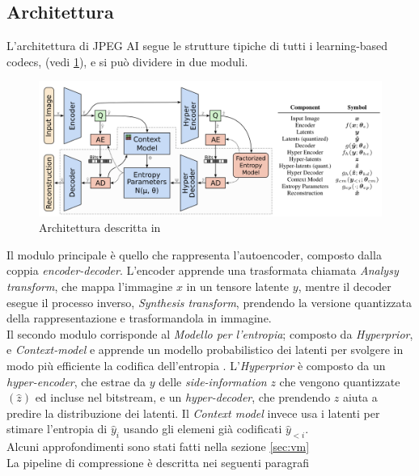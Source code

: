 \subsection{Architettura}\label{sec:architetturaJPEGAI}
L'architettura di JPEG AI segue le strutture tipiche di tutti i learning-based codecs,  \cite{minnen2018joint} (vedi \ref{fig:architmin}), e si può dividere in due moduli.
\begin{figure}
    \centering
    \includegraphics[width=1\linewidth]{img/architetturaJPEGAI.png}
    \caption{Architettura descritta in \cite{minnen2018joint}}
    \label{fig:architmin}
\end{figure}
Il modulo principale è quello che rappresenta l'autoencoder, composto dalla coppia \textit{encoder-decoder}.
L'encoder apprende una trasformata chiamata \textit{Analysy transform}, che mappa l'immagine $x$ in un tensore latente $y$,  mentre il decoder esegue il processo inverso, \textit{Synthesis transform}, prendendo la versione quantizzata della rappresentazione e trasformandola in immagine.\\
Il secondo modulo corrisponde al \textit{Modello per l'entropia}; composto da \textit{Hyperprior}, e \textit{Context-model} e apprende un modello probabilistico dei latenti per svolgere in modo più efficiente la codifica dell'entropia \cite{balle2018variational}. L'\textit{Hyperprior} è composto da un \textit{hyper-encoder}, che estrae da $y$ delle \textit{side-information}  $z$ che vengono quantizzate ${(\hat{z})}$ ed  incluse nel bitstream, e un \textit{hyper-decoder}, che prendendo $z$ aiuta a predire la distribuzione dei latenti. Il \textit{Context model} invece usa i latenti per stimare l'entropia di $\hat{y}_i$ usando gli elemeni già codificati $\hat{y}_{<i}$.\\
Alcuni approfondimenti sono stati fatti nella sezione \ref{sec:vm}
\\
La pipeline di compressione è descritta nei seguenti paragrafi
